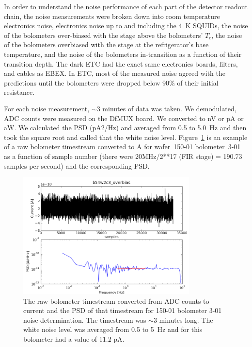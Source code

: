 In order to understand the noise performance of each part of the detector readout chain, the noise measurements were broken down into 
room temperature electronics noise, 
electronics noise up to and including the 4~K \ac{SQUID}s, 
the noise of the bolometers over-biased with the stage above the bolometers' $T_{c}$, 
the noise of the bolometers overbiased with the stage at the refrigerator's base temperature, 
and the noise of the bolometers in-transition as a function of their transition depth. 
The dark \ac{ETC} had the exact same electronics boards, filters, and cables as \ac{EBEX}. 
In \ac{ETC}, most of the measured noise agreed with the predictions until the bolometers were dropped below 90\% of their initial resistance. 

For each noise measurement, $\sim3$ minutes of data was taken. 
We demodulated, \ac{ADC} counts were measured on the  \ac{DfMUX} board. 
We converted to nV or pA or aW. 
We calculated the PSD (pA2/Hz) and averaged from 0.5 to 5.0~Hz and then took the square root and called that the white noise level. 
Figure~\ref{fig:timestream_and_psd} is an example of a raw bolometer timestream converted to A for wafer~150-01 bolometer~3-01 as a function of sample number (there were 20MHz/2**17 (FIR stage) = 190.73 samples per second) and the corresponding PSD.

\begin{figure}[ht!]
\begin{center}
\includegraphics[height=2.5in]{figures/b54w2c3_overbias.png}
\caption{The raw bolometer timestream converted from \ac{ADC} counts to current and the PSD of that timestream for 150-01 bolometer 3-01 noise determination. The timestream was $\sim3$ minutes long. The white noise level was averaged from 0.5 to 5~Hz and for this bolometer had a value of 11.2 pA.
\label{fig:timestream_and_psd} }
\end{center}
\end{figure}



